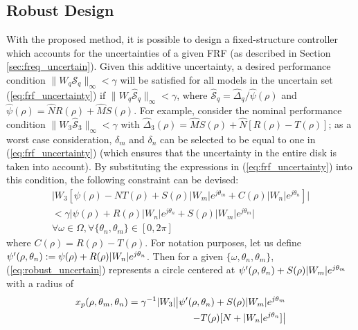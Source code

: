\documentclass[journal]{IEEEtran}
\begin{document}
\subsection{Robust Design}
\label{sec:rob_con}
With the proposed method, it is possible to design a fixed-structure controller which accounts for the uncertainties of a given FRF (as described in Section \ref{sec:freq_uncertain}). Given this additive uncertainty, a desired performance condition $\|W_q \mathcal{S}_q \|_{\infty}<\gamma$ will be satisfied for all models in the uncertain set (\ref{eq:frf_uncertainty}) if $\| W_q \mathcal{\hat{S}}_q\|_{\infty} < \gamma$, where $\mathcal{\hat{S}}_q =\hat{\Delta}_q/\hat{\psi}(\rho)$ and $\hat{\psi}(\rho) = \hat{N}R(\rho) + \hat{M}S(\rho) $. For example, consider the nominal performance condition $\|W_3 \mathcal{\hat{S}}_3 \|_{\infty}<\gamma$ with $\hat{\Delta}_3(\rho) = \hat{M}S(\rho) + \hat{N}[R(\rho)-T(\rho)]$; as a worst case consideration, $\delta_m$ and $\delta_n$ can be selected to be equal to one  in (\ref{eq:frf_uncertainty}) (which ensures that the uncertainty in the entire disk is taken into account).  By substituting the expressions in (\ref{eq:frf_uncertainty}) into this condition, the following constraint can be devised:
\begin{equation} \label{eq:robust_uncertain}
\begin{split} 
 \bigl|W_3 \left[ \psi(\rho) -NT(\rho)+S(\rho)|W_m|e^{j\theta_m} + C(\rho)|W_n|e^{j\theta_n}\right] \bigr| \\
< \gamma \bigl| \psi(\rho) + R(\rho)|W_n|e^{j\theta_n} + S(\rho)|W_m|e^{j\theta_m} \bigr|\\
\forall \omega \in \Omega, \forall \{\theta_n,\theta_m \} \in [0,2\pi]
\end{split}
\end{equation}
where $C(\rho) = R(\rho) - T(\rho)$. For notation purposes, let us define $\psi\sp{\prime}(\rho,\theta_n) := \psi(\rho) + R(\rho)|W_n|e^{j\theta_n}$. Then for a given $\{\omega,\theta_n,\theta_m \}$, (\ref{eq:robust_uncertain}) represents a circle centered at $\psi\sp{\prime}(\rho,\theta_n) + S(\rho)|W_m|e^{j\theta_m}$ with a radius of 
\begin{equation} \label{eq:robust_ness_suff_1}
\begin{split} 
x_p (\rho,\theta_m,\theta_n)  = \gamma^{-1}|W_3| \bigl| \psi\sp{\prime}(\rho,\theta_n)  + S(\rho)|W_m|e^{j\theta_m} \\ - T(\rho)[N+|W_n|e^{j\theta_n}] \bigr|
\end{split}
\end{equation}
\end{document}
